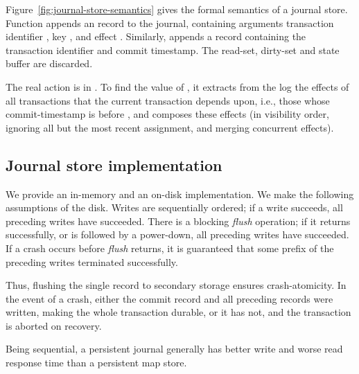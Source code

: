 Figure~\ref{fig:journal-store-semantics} gives the formal semantics of a
journal store.
Function \doUpdate{} appends an \cmdUpdateTag{} record to the journal,
containing arguments transaction identifier \atrans{}, key \akey{}, and
effect \aeffect{}.
Similarly, \doCommit{} %
appends a \jrnlCommitTag{} record containing the transaction identifier
and commit timestamp.
The read-set, dirty-set and state buffer are discarded.

The real action is in \lookup{}.
To find the value of \akey{}, it extracts from the log the effects of
all transactions that the current transaction depends upon, i.e., those
whose commit-timestamp is before \asnpsht{}, and composes these effects
(in visibility order, ignoring all but the most recent assignment, and
merging concurrent effects).

\subsection{Journal store implementation}
\label{sec:journal-implementation}

We provide an in-memory and an on-disk implementation.
We make the following assumptions of the disk.
Writes are sequentially ordered; if a write succeeds, all preceding
writes have succeeded.
There is a blocking \emph{flush} operation; if it returns successfully,
or is followed by a power-down, all preceding writes have succeeded.
If a crash occurs before \emph{flush} returns, it is guaranteed that
some prefix of the preceding writes terminated successfully.

Thus, flushing the single \jrnlCommitTag{} record to secondary storage
ensures crash-atomicity.
In the event of a crash, either the commit record and all
preceding records were written, making the whole transaction durable, or
it has not, and the transaction is aborted on recovery.

Being sequential, a persistent journal generally has better write and
worse read response time than a persistent map store.

